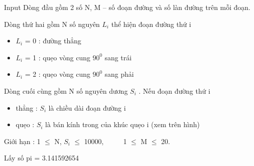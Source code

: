 Input
Dòng đầu gồm 2 số N, M – số đoạn đường và số làn đường trên mỗi đoạn.

Dòng thứ hai gồm N số nguyên $L_{i}$ thể hiện đoạn đường thứ i
\begin{itemize}
	\item $L_{i}$ = 0 : đường thẳng
	\item $L_{i}$ = 1 : quẹo vòng cung $90^{0}$ sang trái
	\item $L_{i}$ = 2 : quẹo vòng cung $90^{0}$ sang phải
\end{itemize}

Dòng cuối cùng gồm N số nguyên dương $S_{i}$ . Nếu đoạn đường thứ i
\begin{itemize}
	\item thẳng : $S_{i}$ là chiều dài đoạn đường i
	\item quẹo : $S_{i}$ là bán kính trong của khúc quẹo i (xem trên hình)
\end{itemize}

Giới hạn : 1  $\le$  N, $S_{i}$  $\le$  10000,       1  $\le$  M  $\le$  20.

Lấy số pi = 3.141592654